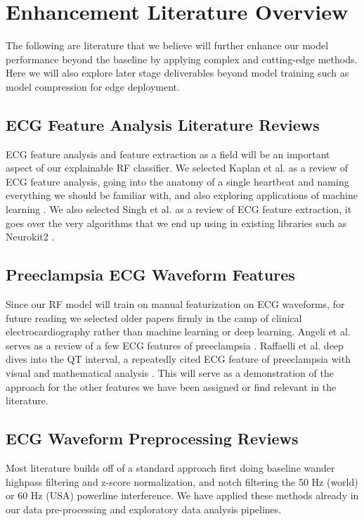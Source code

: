 \documentclass[sigconf,nonacm]{acmart}
\begin{document}
\section{Enhancement Literature Overview}

The following are literature that we believe will further enhance our model performance beyond the baseline by applying complex and cutting-edge methods. Here we will also explore later stage deliverables beyond model training such as model compression for edge deployment.

\subsection{ECG Feature Analysis Literature Reviews}
ECG feature analysis and feature extraction as a field will be an important aspect of our explainable RF classifier. We selected Kaplan et al. as a review of ECG feature analysis, going into the anatomy of a single heartbeat and naming everything we should be familiar with, and also exploring applications of machine learning \cite{kaplan_berkaya_survey_2018}. We also selected Singh et al. as a review of ECG feature extraction, it goes over the very algorithms that we end up using in existing libraries such as Neurokit2 \cite{singh_ecg_2023}.

\subsection{Preeclampsia ECG Waveform Features}

Since our RF model will train on manual featurization on ECG waveforms, for future reading we selected older papers firmly in the camp of clinical electrocardiography rather than machine learning or deep learning. Angeli et al. serves as a review of a few ECG features of preeclampsia \cite{angeli_novel_2015}. Raffaelli et al. deep dives into the QT interval, a repeatedly cited ECG feature of preeclampsia with visual and mathematical analysis \cite{raffaelli_pre-eclampsia_2014}. This will serve as a demonstration of the approach for the other features we have been assigned or find relevant in the literature.

\subsection{ECG Waveform Preprocessing Reviews}

Most literature builds off of a standard approach first doing baseline wander highpass filtering and z-score normalization, and notch filtering the 50 Hz (world) or 60 Hz (USA) powerline interference. We have applied these methods already in our data pre-processing and exploratory data analysis pipelines.
\end{document}

